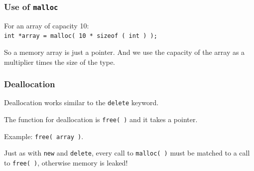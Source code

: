 \begin{frame}
\frametitle{Use of \texttt{malloc}}

For an array of capacity 10:\\
\quad \texttt{int *array = malloc( 10 * sizeof ( int ) );}

So a memory array is just a pointer. And we use the capacity of the array as a multiplier times the size of the type.

\end{frame}



\begin{frame}
\frametitle{Deallocation}

Deallocation works similar to the \texttt{delete} keyword.

The function for deallocation is \texttt{free( )} and it takes a pointer.

Example: \texttt{free( array )}.

Just as with \texttt{new} and \texttt{delete}, every call to \texttt{malloc( )} must be matched to a call to \texttt{free( )}, otherwise memory is leaked!


\end{frame}



